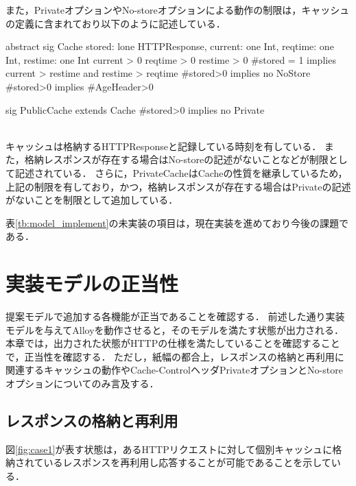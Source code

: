 \documentclass{css}
\begin{document}
また，PrivateオプションやNo-storeオプションによる動作の制限は，キャッシュの定義に含まれており以下のように記述している．\\\hrulefill
\begin{small}
\begin{verbatimtab}[4]
abstract sig Cache{
	stored: lone HTTPResponse,
	current: one Int,
	reqtime: one Int,
	restime: one Int
}{
	current > 0
	reqtime > 0
	restime > 0
	#stored  = 1 implies
		current > restime and restime > reqtime
	#stored>0 implies no NoStore
	#stored>0 implies #AgeHeader>0
}

sig PublicCache extends Cache{}{
	#stored>0 implies no Private
}
\end{verbatimtab}
\end{small}
\hrulefill\\
キャッシュは格納するHTTPResponseと記録している時刻を有している．
また，格納レスポンスが存在する場合はNo-storeの記述がないことなどが制限として記述されている．
\color{red}
さらに，PrivateCacheはCacheの性質を継承しているため，上記の制限を有しており，かつ，格納レスポンスが存在する場合はPrivateの記述がないことを制限として追加している．
\color{black}

表\ref{tb:model_implement}の未実装の項目は，現在実装を進めており今後の課題である．

\section{実装モデルの正当性}
\label{sec:correctness}
\color{red}
提案モデルで追加する各機能が正当であることを確認する．
\color{black}
前述した通り実装モデルを与えてAlloyを動作させると，そのモデルを満たす状態が出力される．
本章では，出力された状態がHTTPの仕様を満たしていることを確認することで，正当性を確認する．
\color{red}
ただし，紙幅の都合上，レスポンスの格納と再利用に関連するキャッシュの動作やCache-ControlヘッダPrivateオプションとNo-storeオプションについてのみ言及する．
\color{black}

\subsection{レスポンスの格納と再利用}
\color{red}
図\ref{fig:case1}が表す状態は，あるHTTPリクエストに対して個別キャッシュに格納されているレスポンスを再利用し応答することが可能であることを示している．
\color{black}
\end{document}
